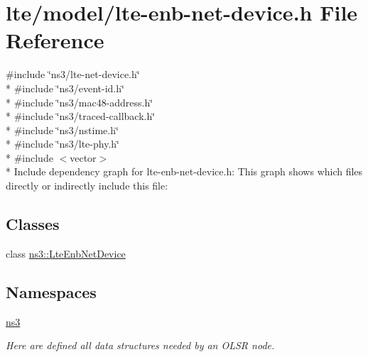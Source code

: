 \hypertarget{lte-enb-net-device_8h}{}\section{lte/model/lte-\/enb-\/net-\/device.h File Reference}
\label{lte-enb-net-device_8h}
{\ttfamily \#include \char`\"{}ns3/lte-\/net-\/device.\+h\char`\"{}}\\*
{\ttfamily \#include \char`\"{}ns3/event-\/id.\+h\char`\"{}}\\*
{\ttfamily \#include \char`\"{}ns3/mac48-\/address.\+h\char`\"{}}\\*
{\ttfamily \#include \char`\"{}ns3/traced-\/callback.\+h\char`\"{}}\\*
{\ttfamily \#include \char`\"{}ns3/nstime.\+h\char`\"{}}\\*
{\ttfamily \#include \char`\"{}ns3/lte-\/phy.\+h\char`\"{}}\\*
{\ttfamily \#include $<$vector$>$}\\*
Include dependency graph for lte-\/enb-\/net-\/device.h\+:
This graph shows which files directly or indirectly include this file\+:
\subsection*{Classes}
\begin{DoxyCompactItemize}
\item 
class \hyperlink{classns3_1_1LteEnbNetDevice}{ns3\+::\+Lte\+Enb\+Net\+Device}
\end{DoxyCompactItemize}
\subsection*{Namespaces}
\begin{DoxyCompactItemize}
\item 
 \hyperlink{namespacens3}{ns3}
\begin{DoxyCompactList}\small\item\em Here are defined all data structures needed by an O\+L\+SR node. \end{DoxyCompactList}\end{DoxyCompactItemize}
